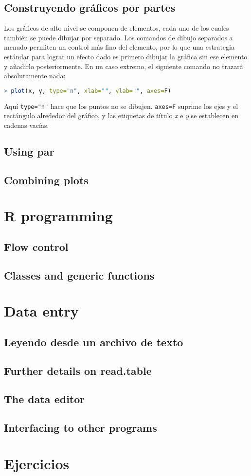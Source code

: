 \subsection{Construyendo gráficos por partes}

Los gráficos de alto nivel se componen de elementos, cada uno de los cuales
también se puede dibujar por separado. Los comandos de dibujo separados a menudo
permiten un control más fino del elemento, por lo que una estrategia estándar
para lograr un efecto dado es primero dibujar la gráfica sin ese elemento y
añadirlo posteriormente. En un caso extremo, el siguiente comando no trazará
absolutamente nada:

\begin{lstlisting}[language=R]
> plot(x, y, type="n", xlab="", ylab="", axes=F)
\end{lstlisting}

Aquí \texttt{type="n"} hace que los puntos no se dibujen. \texttt{axes=F}
suprime los ejes y el rectángulo alrededor del gráfico, y las etiquetas de
título \textit{x} e \textit{y} se establecen en cadenas vacías.

\newpage
\subsection{Using par}
\subsection{Combining plots}

\section{R programming}
\subsection{Flow control} \label{flowcontrol}
\subsection{Classes and generic functions}

\section{Data entry}
\subsection{Leyendo desde un archivo de texto} \label{readtextfile}
\subsection{Further details on read.table}
\subsection{The data editor}
\subsection{Interfacing to other programs}
\section{Ejercicios}
